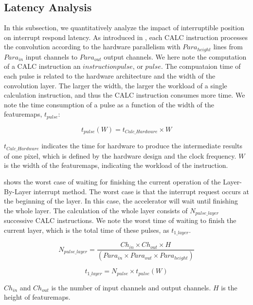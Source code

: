 \subsection {Latency Analysis}

In this subsection, we quantitatively analyze the impact of interruptible position on interrupt respond latency. 
As introduced in , each CALC  instruction processes the convolution according to the hardware parallelism with $Para_{height}$ lines from $ Para_{in} $ input channels to $ Para_{out}$ output channels. 
We here note the computation of a CALC instruction an $instruction pulse$, or $pulse$.
The compuataion time of each pulse is related to the hardware architecture and the width of the convolution layer. The larger the width, the larger the workload of a single calculation instruction, and thus the CALC instruction consumes more time. We note the time consumption of a pulse as a function of the width of the featuremaps, $t_{pulse}$:

\begin{equation}
	t_{pulse}(W) = t_{Calc\_Hardware} \times W
\end{equation}

$t_{Calc\_Hardware}$ indicates the time for hardware to produce the intermediate results of one pixel, which is defined by the hardware design and the clock frequency. $W$ is the width of the featuremaps, indicating the workload of the instruction.

 shows the worst case of waiting for finishing the current operation of the Layer-By-Layer interrupt method. The worst case is that the interrupt request occurs at the beginning of the layer. In this case, the accelerator will wait until finishing the whole layer. The calculation of the whole layer consists of $N_{pulse\_layer}$ successive CALC instructions. We note the worst time of waiting to finish the current layer, which is the total time of these pulses, as $t_{1\_layer}$.

\begin{equation}
	N_{pulse\_layer} = \frac{ Ch_{in} \times Ch_{out} \times H }{ (Para_{in} \times Para_{out} \times Para_{height}) } 
\end{equation}

\begin{equation}
t_{1\_layer} = N_{pulse} \times t_{pulse}(W)
\end{equation}

$Ch_{in}$ and $Ch_{out}$ is the number of input channels and output channels. $H$ is the height of featuremaps.

